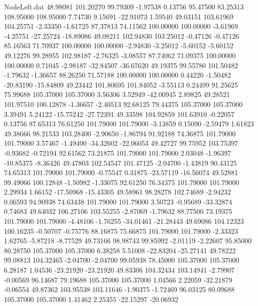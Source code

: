 \begin{filecontents}{NodeLeft.dat}
  48.98081  101.20270   99.79309    -1.97538    0.13756   95.47500   83.25313  108.95000  108.95000    7.74730    9.15691  -22.91073    1.59540
  49.03151  103.61969  104.25751    -2.33350   -1.61725   87.37813   74.11562  100.00000  100.00000   -3.61969   -4.25751  -27.25724  -18.89086
  49.08211  102.94830  103.25012    -0.47126   -0.47126   85.16563   71.70937  100.00000  100.00000   -2.94830   -3.25012   -5.60152   -5.60152
  49.12276   99.28955  102.98187    -2.76325   -3.08557   87.74062   71.09375  100.00000  100.00000    0.71045   -2.98187  -32.84507  -36.67620
  49.19375   99.55780  101.50482    -1.79632   -1.36657   88.26250   71.57188  100.00000  100.00000    0.44220   -1.50482  -20.83190  -15.84809
  49.23442  101.80695  101.84052    -3.55113    0.24499   91.25625   75.99688  105.37000  105.37000    3.56306    3.52949  -42.00945    2.89825
  49.28521  101.97510  100.12878    -1.36657   -2.40513   92.68125   79.44375  105.37000  105.37000    3.39491    5.24122  -15.75242  -27.72391
  49.33598  104.92859  101.63910    -0.22057    0.13756   87.65313   76.61250  101.79000  101.79000   -3.13859    0.15090   -2.59479    1.61823
  49.38666   98.21533  103.28400    -2.90650   -1.86794   91.92188   74.36875  101.79000  101.79000    3.57467   -1.49400  -34.32602  -22.06053
  49.42727   99.75952  103.75397    -0.93682   -0.72194   92.61562   73.21875  101.79000  101.79000    2.03048   -1.96397  -10.85375   -8.36426
  49.47803  102.54547  101.47125    -2.04700   -1.43819   90.43125   74.65313  101.79000  101.79000   -0.75547    0.31875  -23.57119  -16.56074
  49.52881   99.49066  100.12848    -1.50982   -1.33075   92.61250   76.34375  101.79000  101.79000    2.29934    1.66152  -17.50968  -15.43305
  49.58961   98.28278  102.74689    -2.94232    0.06593   94.90938   74.63438  101.79000  101.79000    3.50723   -0.95689  -33.32874    0.74683
  49.64032  106.27106  103.55255    -2.87069   -1.79632   88.77500   73.19375  101.79000  101.79000   -4.48106   -1.76255  -34.01461  -21.28443
  49.69086  104.12323  100.16235    -0.50707   -0.75776   88.16875   75.66875  101.79000  101.79000   -2.33323    1.62765   -5.87218   -8.77529
  49.73166   98.98743   99.85992    -2.01119   -2.22607   95.85000   80.28750  105.37000  105.37000    6.38258    5.51008  -22.83204  -25.27141
  49.78222   99.08813  104.32465    -2.04700   -2.04700   99.05938   78.45000  105.37000  105.37000    6.28187    1.04536  -23.21920  -23.21920
  49.83306  104.32434  103.14941    -2.79907   -0.00569   96.14687   79.19688  105.37000  105.37000    1.04566    2.22059  -32.21879   -0.06554
  49.87362  103.95538  103.11646    -1.90375   -1.72469   96.03125   80.09688  105.37000  105.37000    1.41462    2.25355  -22.15297  -20.06932

\end{filecontents}
